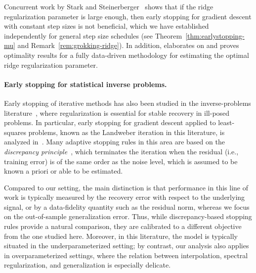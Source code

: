 \documentclass[11pt]{article}
\begin{document}
Concurrent work by Stark and Steinerberger~\cite{StarkSteinerberger2025} shows that if the ridge regularization parameter is large enough, then early stopping for gradient descent with constant step sizes is not beneficial, which we have established independently for general step size schedules (see Theorem~\ref{thm:earlystopping-mu} and Remark~\ref{rem:grokking-ridge}). In addition, \cite{StarkSteinerberger2025} elaborates on and proves optimality results for a fully data-driven methodology for estimating the optimal ridge regularization parameter.

\paragraph{Early stopping for statistical inverse problems.}
Early stopping of iterative methods has also been studied in the inverse-problems literature~\cite{blanchard2018early, blanchard2018optimal, hucker2025early, miftachov2025early}, where regularization is essential for stable recovery in ill-posed problems. In particular, early stopping for gradient descent applied to least-squares problems, known as the Landweber iteration in this literature, is analyzed in~\cite{blanchard2018optimal}. Many adaptive stopping rules in this area are based on the \emph{discrepancy principle}~\cite{EnglEtAl1996}, which terminates the iteration when the residual (i.e., training error) is of the same order as the noise level, which is assumed to be known a priori or able to be estimated.

Compared to our setting, the main distinction is that performance in this line of work is typically measured by the recovery error with respect to the underlying signal, or by a data-fidelity quantity such as the residual norm, whereas we focus on the out-of-sample generalization error. Thus, while discrepancy-based stopping rules provide a natural comparison, they are calibrated to a different objective from the one studied here. Moreover, in this literature, the model is typically situated in the underparameterized setting; by contrast, our analysis also applies in overparameterized settings, where the relation between interpolation, spectral regularization, and generalization is especially delicate.
\end{document}
